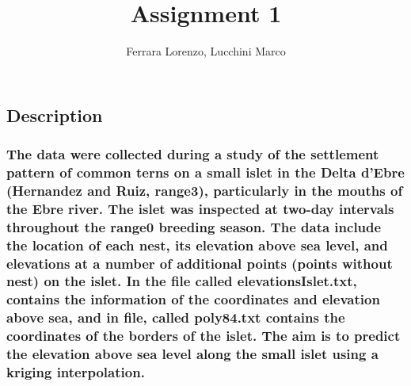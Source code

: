 \documentclass[
]{article}
\title{Assignment 1}
\author{Ferrara Lorenzo, Lucchini Marco}
\date{}
\begin{document}
\maketitle

\hypertarget{description}{%
\subsection{Description}\label{description}}

\hypertarget{the-data-were-collected-during-a-study-of-the-settlement-pattern-of-common-terns-on-a-small-islet-in-the-delta-debre-hernandez-and-ruiz-range3-particularly-in-the-mouths-of-the-ebre-river.-the-islet-was-inspected-at-two-day-intervals-throughout-the-range0-breeding-season.-the-data-include-the-location-of-each-nest-its-elevation-above-sea-level-and-elevations-at-a-number-of-additional-points-points-without-nest-on-the-islet.-in-the-file-called-elevationsislet.txt-contains-the-information-of-the-coordinates-and-elevation-above-sea-and-in-file-called-poly84.txt-contains-the-coordinates-of-the-borders-of-the-islet.-the-aim-is-to-predict-the-elevation-above-sea-level-along-the-small-islet-using-a-kriging-interpolation.}{%
\subsubsection{The data were collected during a study of the settlement
pattern of common terns on a small islet in the Delta d'Ebre (Hernandez
and Ruiz, range3), particularly in the mouths of the Ebre river. The
islet was inspected at two-day intervals throughout the range0 breeding
season. The data include the location of each nest, its elevation above
sea level, and elevations at a number of additional points (points
without nest) on the islet. In the file called elevationsIslet.txt,
contains the information of the coordinates and elevation above sea, and
in file, called poly84.txt contains the coordinates of the borders of
the islet. The aim is to predict the elevation above sea level along the
small islet using a kriging
interpolation.}\label{the-data-were-collected-during-a-study-of-the-settlement-pattern-of-common-terns-on-a-small-islet-in-the-delta-debre-hernandez-and-ruiz-range3-particularly-in-the-mouths-of-the-ebre-river.-the-islet-was-inspected-at-two-day-intervals-throughout-the-range0-breeding-season.-the-data-include-the-location-of-each-nest-its-elevation-above-sea-level-and-elevations-at-a-number-of-additional-points-points-without-nest-on-the-islet.-in-the-file-called-elevationsislet.txt-contains-the-information-of-the-coordinates-and-elevation-above-sea-and-in-file-called-poly84.txt-contains-the-coordinates-of-the-borders-of-the-islet.-the-aim-is-to-predict-the-elevation-above-sea-level-along-the-small-islet-using-a-kriging-interpolation.}}
\end{document}
